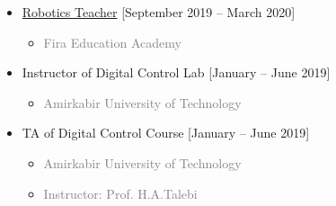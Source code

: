 \documentclass[10pt,a4paper,sans]{moderncv} %
\begin{document}
\begin{itemize}
			\item {} \href{https://ramantech.academy/}{Robotics Teacher} \hfill [September 2019 -- March 2020]
			\begin{itemize}
				\item \textcolor{gray}{Fira Education Academy}
			\end{itemize}	

\item {} Instructor of Digital Control Lab \hfill [January -- June 2019]
			\begin{itemize}
				\item \textcolor{gray}{Amirkabir University of Technology}
			\end{itemize}	
\item {} TA of Digital Control Course \hfill [January -- June 2019]
			\begin{itemize}
				\item \textcolor{gray}{Amirkabir University of Technology}
				\item \textcolor{gray}{Instructor: Prof. H.A.Talebi}
			\end{itemize}				
		\end{itemize}
	
	
\end{document}
